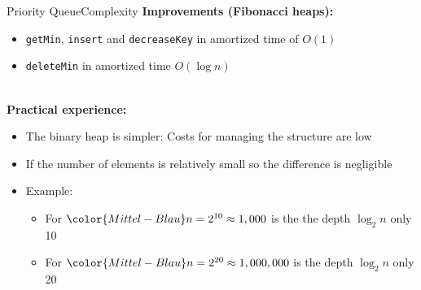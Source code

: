 \begin{frame}{Priority Queue}{Complexity}
  \textbf{Improvements (Fibonacci heaps):}
  \begin{itemize}
    \item<2->
      {\color{Mittel-Blau}\texttt{getMin}},
      {\color{Mittel-Blau}\texttt{insert}} and
      {\color{Mittel-Blau}\texttt{decreaseKey}}
      in amortized time of {\color{Mittel-Blau}$O(1)$}
    \item<3->
      {\color{Mittel-Blau}\texttt{deleteMin}}
      in amortized time {\color{Mittel-Blau}$O(\log n)$}
  \end{itemize}
  \hfill\\[0.5em]
  \textbf{Practical experience:}
  \begin{itemize}
    \item<5->
      The binary heap is simpler: Costs for managing the structure are low
    \item<6->
      If the number of elements is relatively small so the difference is
      negligible
    \item<7->
      Example:
    \begin{itemize}
      \item
        For ${\color{Mittel-Blau}n = 2^{10}} \approx 1,000$ is the the
        {\color{Mittel-Blau}depth}
        $\log_2 n$ only 10
      \item
        For ${\color{Mittel-Blau}n = 2^{20}} \approx 1,000,000$ is the
        {\color{Mittel-Blau}depth}
        $\log_2 n$ only 20
    \end{itemize}
  \end{itemize}
\end{frame}
